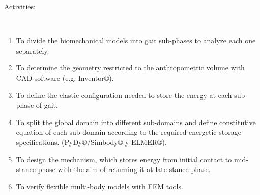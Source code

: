 \documentclass[12pt,english]{article}
\begin{document}
\begin{description}
\item [{Activities:}]~\end{description}
\begin{enumerate}
\item To divide the biomechanical models into gait sub-phases to analyze each one separately.
\item To determine the geometry restricted to the anthropometric volume with CAD software (e.g. Inventor$\circledR$).
\item To define the elastic configuration needed to store the energy at each sub-phase of gait.
\item To split the global domain into different sub-domains and define constitutive equation of each sub-domain according to the required energetic storage specifications. (PyDy$\circledR$/Simbody$\circledR$ y ELMER$\circledR$).
\item To design the mechanism, which stores energy from initial contact to mid-stance phase with the aim of returning it at late stance phase. 
\item To verify flexible multi-body models with FEM tools.\end{enumerate}
\end{document}
